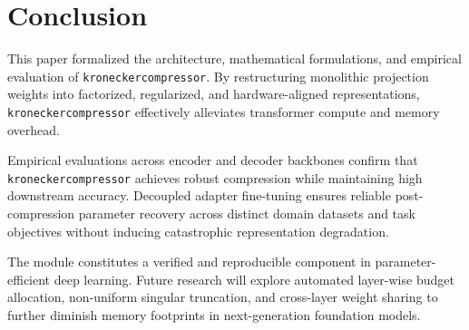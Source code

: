 \section{Conclusion}
This paper formalized the architecture, mathematical formulations, and empirical evaluation of \texttt{kroneckercompressor}. By restructuring monolithic projection weights into factorized, regularized, and hardware-aligned representations, \texttt{kroneckercompressor} effectively alleviates transformer compute and memory overhead.

Empirical evaluations across encoder and decoder backbones confirm that \texttt{kroneckercompressor} achieves robust compression while maintaining high downstream accuracy. Decoupled adapter fine-tuning ensures reliable post-compression parameter recovery across distinct domain datasets and task objectives without inducing catastrophic representation degradation.

The module constitutes a verified and reproducible component in parameter-efficient deep learning. Future research will explore automated layer-wise budget allocation, non-uniform singular truncation, and cross-layer weight sharing to further diminish memory footprints in next-generation foundation models.
